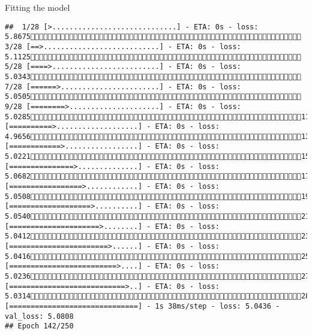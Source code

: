 \documentclass[
  ignorenonframetext,
]{beamer}
\begin{document}
\begin{frame}[fragile]{Fitting the model}
\begin{verbatim}
##  1/28 [>.............................] - ETA: 0s - loss: 5.8675 3/28 [==>...........................] - ETA: 0s - loss: 5.1125 5/28 [====>.........................] - ETA: 0s - loss: 5.0343 7/28 [======>.......................] - ETA: 0s - loss: 5.0505 9/28 [========>.....................] - ETA: 0s - loss: 5.028511/28 [==========>...................] - ETA: 0s - loss: 4.965613/28 [============>.................] - ETA: 0s - loss: 5.022115/28 [===============>..............] - ETA: 0s - loss: 5.068217/28 [=================>............] - ETA: 0s - loss: 5.050819/28 [===================>..........] - ETA: 0s - loss: 5.054021/28 [=====================>........] - ETA: 0s - loss: 5.041223/28 [=======================>......] - ETA: 0s - loss: 5.041625/28 [=========================>....] - ETA: 0s - loss: 5.023627/28 [===========================>..] - ETA: 0s - loss: 5.031428/28 [==============================] - 1s 38ms/step - loss: 5.0436 - val_loss: 5.0808
## Epoch 142/250

\end{verbatim}
\end{frame}
\end{document}
